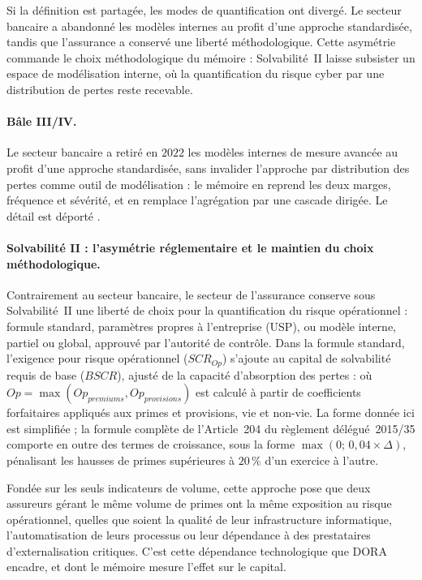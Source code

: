 Si la définition est partagée, les modes de quantification ont divergé. Le secteur bancaire a
abandonné les modèles internes au profit d'une approche standardisée, tandis que l'assurance a
conservé une liberté méthodologique. Cette asymétrie commande le choix méthodologique du
mémoire : Solvabilité~II laisse subsister un espace de modélisation interne, où la
quantification du risque cyber par une distribution de pertes reste recevable.

\paragraph{Bâle III/IV.} Le secteur bancaire a retiré en $2022$ les modèles internes de mesure
avancée au profit d'une approche standardisée, sans invalider l'approche par distribution des
pertes comme outil de modélisation : le mémoire en reprend les deux marges, fréquence et
sévérité, et en remplace l'agrégation par une cascade dirigée. Le détail est déporté
\matcomp.

\paragraph{Solvabilité II : l'asymétrie réglementaire et le maintien du choix méthodologique.}
Contrairement au secteur bancaire, le secteur de l'assurance conserve sous Solvabilité~II
une liberté de choix pour la quantification du risque opérationnel : formule standard,
paramètres propres à l'entreprise (USP), ou modèle interne, partiel ou global, approuvé
par l'autorité de contrôle. Dans la formule standard, l'exigence pour risque opérationnel
($SCR_{Op}$) s'ajoute au capital de solvabilité requis de base
($BSCR$), ajusté de la capacité d'absorption des pertes :
où $Op = \max(Op_{premiums}, Op_{provisions})$ est calculé à partir de coefficients
forfaitaires appliqués aux primes et provisions, vie et non-vie. La forme donnée ici est
simplifiée ; la formule complète de l'Article~204 du règlement délégué~2015/35
comporte en outre des termes de croissance, sous la forme
$\max\!\left(0;\, 0{,}04 \times \Delta\!\right)$, pénalisant les hausses de primes
supérieures à $20\,\%$ d'un exercice à l'autre.

Fondée sur les seuls indicateurs de volume, cette approche pose que deux assureurs gérant le
même volume de primes ont la même exposition au risque opérationnel, quelles que soient la
qualité de leur infrastructure informatique, l'automatisation de leurs processus ou leur
dépendance à des prestataires d'externalisation critiques. C'est cette dépendance
technologique que DORA encadre, et dont le mémoire mesure l'effet sur le capital.


